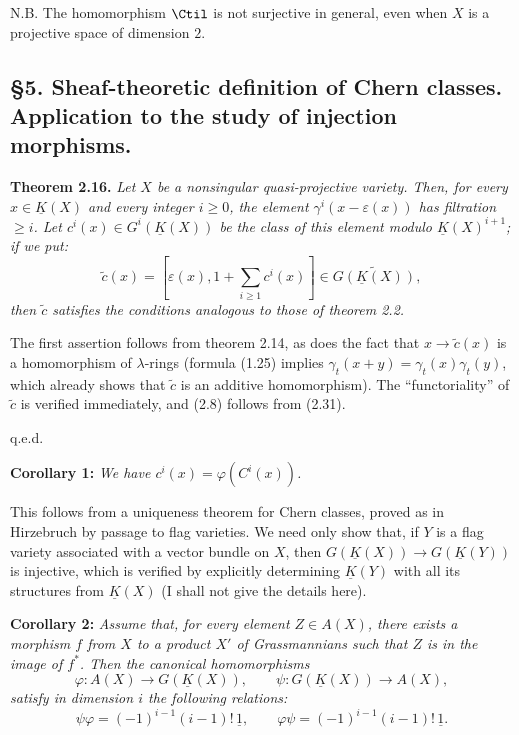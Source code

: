 N.B. The homomorphism $\Ctil$ is not surjective in general, even when $X$ is a projective space of dimension $2$.

\subsection*{\S 5. Sheaf-theoretic definition of Chern classes. Application to the study of injection morphisms.}

\textbf{Theorem 2.16.} \emph{Let $X$ be a nonsingular quasi-projective variety. Then, for every $x\in\underline K(X)$ and every integer $i\geq0$, the element $\gamma^i(x-\varepsilon(x))$ has filtration $\geq i$. Let $c^i(x)\in G^i(\underline K(X))$ be the class of this element modulo $\underline K(X)^{i+1}$; if we put:}
\[
 \widetilde c(x)=\left[\varepsilon(x),1+\sum_{i\geq1}c^i(x)\right]\in\widetilde{G(\underline K(X))},
\]
\emph{then $\widetilde c$ satisfies the conditions analogous to those of theorem 2.2.}

The first assertion follows from theorem 2.14, as does the fact that $x\longrightarrow\widetilde c(x)$ is a homomorphism of $\lambda$-rings (formula (1.25) implies $\gamma_t(x+y)=\gamma_t(x)\gamma_t(y)$, which already shows that $\widetilde c$ is an additive homomorphism). The ``functoriality'' of $\widetilde c$ is verified immediately, and
%
(2.8) follows from (2.31).
\begin{flushright}q.e.d.\end{flushright}

\textbf{Corollary 1:} \emph{We have $c^i(x)=\varphi(C^i(x))$.}

This follows from a uniqueness theorem for Chern classes, proved as in Hirzebruch by passage to flag varieties. We need only show that, if $Y$ is a flag variety associated with a vector bundle on $X$, then $G(\underline K(X))\longrightarrow G(\underline K(Y))$ is injective, which is verified by explicitly determining $\underline K(Y)$ with all its structures from $\underline K(X)$ (I shall not give the details here).

\textbf{Corollary 2:} \emph{Assume that, for every element $Z\in A(X)$, there exists a morphism $f$ from $X$ to a product $X'$ of Grassmannians such that $Z$ is in the image of $f^*$. Then the canonical homomorphisms}
\[
 \varphi:A(X)\longrightarrow G(\underline K(X)),\qquad \psi:G(\underline K(X))\longrightarrow A(X),
\]
\emph{satisfy in dimension $i$ the following relations:}
\begin{equation}\tag{2.35}
 \psi\varphi=(-1)^{i-1}(i-1)!\,\underline 1,\qquad
 \varphi\psi=(-1)^{i-1}(i-1)!\,\underline 1.
\end{equation}

